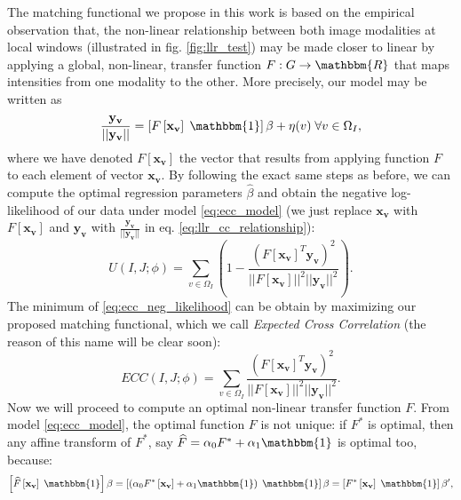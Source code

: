 The matching functional we propose in this work is based on the empirical observation that, the non-linear relationship between both image modalities at local windows (illustrated in fig. \ref{fig:llr_test}) may be made closer to linear by applying a global, non-linear, transfer function $F: G \rightarrow \mathbbm{R}$ that maps intensities from one modality to the other. More precisely, our model may be written as
\begin{equation}\label{eq:ecc_model}
    \frac{\mathbf{y_{v}}}{||\mathbf{y_{v}}||} = \left[F\left[\mathbf{x_{v}}\right] \; \mathbbm{1}\right]\beta + \eta(v) \; \forall v\in\Omega_{I},
\end{equation}
where we have denoted $F[\mathbf{x_{v}}]$ the vector that results from applying function $F$ to each element of vector $\mathbf{x_{v}}$. By following the exact same steps as before, we can compute the optimal regression parameters $\widehat{\beta}$ and obtain the negative log-likelihood of our data under model \eqref{eq:ecc_model} (we just replace $\mathbf{x_{v}}$ with $F[\mathbf{x_{v}}]$ and $\mathbf{y_{v}}$ with $\frac{\mathbf{y_{v}}}{||\mathbf{y_{v}}||}$ in eq. \eqref{eq:llr_cc_relationship}):
\begin{equation}\label{eq:ecc_neg_likelihood}
    U(I, J;\phi) = \sum_{v\in\Omega_{I}}\left(1-\frac{\left(F\left[\mathbf{x_{v}}\right]^{T} \mathbf{y_{v}}\right)^{2}}{||F\left[\mathbf{x_{v}}\right]||^{2}||\mathbf{y_{v}}||^{2}}\right).
\end{equation}
The minimum of \eqref{eq:ecc_neg_likelihood} can be obtain by maximizing our proposed matching functional, which we call \emph{Expected Cross Correlation} (the reason of this name will be clear soon):
\begin{equation}\label{eq:ecc_functional}
    ECC(I, J;\phi) = \sum_{v\in\Omega_{I}}\frac{\left(F\left[\mathbf{x_{v}}\right]^{T} \mathbf{y_{v}}\right)^{2}}{||F\left[\mathbf{x_{v}}\right]||^{2}||\mathbf{y_{v}}||^{2}}.
\end{equation}
Now we will proceed to compute an optimal non-linear transfer function $F$. From model \eqref{eq:ecc_model}, the optimal function $F$ is not unique: if $F^{*}$ is optimal, then any affine transform of $F^{*}$, say $\widehat{F} = \alpha_{0} F^{*} + \alpha_{1}\mathbbm{1}$ is optimal too, because:
\begin{displaymath}
    \left[\widehat{F}\left[\mathbf{x_{v}}\right] \; \mathbbm{1}\right]\beta =
    \left[\left(\alpha_{0}F^{*}\left[\mathbf{x_{v}}\right]+\alpha_{1}\mathbbm{1}\right) \; \mathbbm{1}\right]\beta =
    \left[F^{*}\left[\mathbf{x_{v}}\right] \; \mathbbm{1}\right]\beta',
\end{displaymath}
